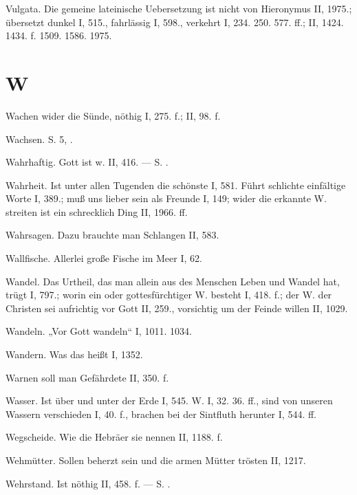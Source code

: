 Vulgata. Die gemeine lateinische Uebersetzung ist nicht von Hieronymus II, 1975.; übersetzt dunkel I, 515., fahrlässig I, 598., verkehrt I, 234. 250. 577. ff.; II, 1424. 1434. f. 1509. 1586. 1975.

\section{W}

Wachen wider die Sünde, nöthig I, 275. f.; II, 98. f.

Wachsen. S.  5, .

Wahrhaftig. Gott ist w. II, 416. — S. .

Wahrheit. Ist unter allen Tugenden die schönste I, 581. Führt schlichte einfältige Worte I, 389.; muß uns lieber sein als Freunde I, 149; wider die erkannte W. streiten ist ein schrecklich Ding II, 1966. ff.

Wahrsagen. Dazu brauchte man Schlangen II, 583.

Wallfische. Allerlei große Fische im Meer I, 62.

Wandel. Das Urtheil, das man allein aus des Menschen Leben und Wandel hat, trügt I, 797.; worin ein  oder gottesfürchtiger W. besteht I, 418. f.; der W. der Christen sei aufrichtig vor Gott II, 259., vorsichtig um der Feinde willen II, 1029.

Wandeln. „Vor Gott wandeln“ I, 1011. 1034.

Wandern. Was das heißt I, 1352.

Warnen soll man Gefährdete II, 350. f.

Wasser. Ist über und unter der Erde I, 545. W.  I, 32. 36. ff., sind von unseren Wassern verschieden I, 40. f., brachen bei der Sintfluth herunter I, 544. ff.

Wegscheide. Wie die Hebräer sie nennen II, 1188. f.

Wehmütter. Sollen beherzt sein und die armen Mütter trösten II, 1217.

Wehrstand. Ist nöthig II, 458. f. — S. .

